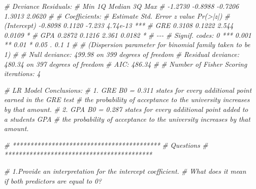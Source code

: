 \documentclass[
]{article}
\newenvironment{Shaded}{\begin{snugshade}}{\end{snugshade}}
\newcommand{\CommentTok}[1]{\textcolor[rgb]{0.56,0.35,0.01}{\textit{#1}}}
\begin{document}
\begin{Shaded}
\begin{Highlighting}[]
    \CommentTok{\# Deviance Residuals: }
    \CommentTok{\#   Min       1Q   Median       3Q      Max  }
    \CommentTok{\# {-}1.2730  {-}0.8988  {-}0.7206   1.3013   2.0620  }
    \CommentTok{\# }
    \CommentTok{\# Coefficients:}
    \CommentTok{\#           Estimate Std.   Error     z value   Pr(\textgreater{}|z|)    }
    \CommentTok{\# (Intercept)    {-}0.8098     0.1120  {-}7.233 4.74e{-}13 ***}
    \CommentTok{\#   GRE           0.3108     0.1222   2.544   0.0109 *  }
    \CommentTok{\#   GPA           0.2872     0.1216   2.361   0.0182 *  }
    \CommentTok{\#   {-}{-}{-}}
    \CommentTok{\#   Signif. codes:  0 \textquotesingle{}***\textquotesingle{} 0.001 \textquotesingle{}**\textquotesingle{} 0.01 \textquotesingle{}*\textquotesingle{} 0.05 \textquotesingle{}.\textquotesingle{} 0.1 \textquotesingle{} \textquotesingle{} 1}
    \CommentTok{\# }
    \CommentTok{\# (Dispersion parameter for binomial family taken to be 1)}
    \CommentTok{\# }
    \CommentTok{\# Null deviance: 499.98  on 399  degrees of freedom}
    \CommentTok{\# Residual deviance: 480.34  on 397  degrees of freedom}
    \CommentTok{\# AIC: 486.34}
    \CommentTok{\# }
    \CommentTok{\# Number of Fisher Scoring iterations: 4}


\CommentTok{\# LR Model Conclusions:  }
    \CommentTok{\# 1. GRE B0 = 0.311 states for every additional point earned in the GRE test }
    \CommentTok{\#   the probability of acceptance to the university increases by that amount. }
    \CommentTok{\# 2. GPA B0 = 0.287 states for every additional point added to a student\textquotesingle{}s GPA}
    \CommentTok{\#   the probability of acceptance to the university increases by that amount. }


\CommentTok{\# ******************************************}
\CommentTok{\# Questions}
\CommentTok{\# ******************************************}

\CommentTok{\# 1.Provide an interpretation for the intercept coefficient. }
\CommentTok{\#   What does it mean if both predictors are equal to 0? }
\end{Highlighting}
\end{Shaded}
\end{document}
